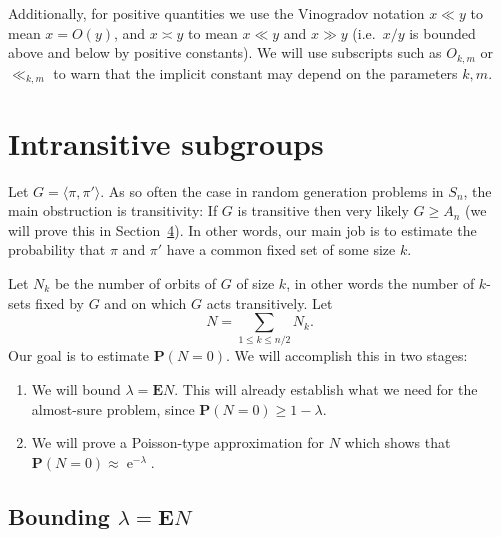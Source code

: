 \documentclass[10pt,a4paper]{amsart}
\newcommand{\ie}{i.e.\ }
\theoremstyle{remark}
\DeclareMathOperator{\expe}{e}
\renewcommand\P{\mathbf{P}}
\newcommand\E{\mathbf{E}}
\begin{document}
Additionally, for positive quantities we use the Vinogradov notation $x \ll y$ to mean $x = O(y)$, and $x \asymp y$ to mean $x \ll y$ and $x \gg y$ (\ie $x/y$ is bounded above and below by positive constants).
We will use subscripts such as $O_{k,m}$ or $\ll_{k,m}$ to warn that the implicit constant may depend on the parameters $k, m$.

\setcounter{section}{2}
\section{Intransitive subgroups} \label{sec:intransitive}

Let $G = \langle \pi, \pi'\rangle$. As so often the case in random generation problems in $S_n$, the main obstruction is transitivity: If $G$ is transitive then very likely $G \geq A_n$ (we will prove this in Section~\href{https://alco.centre-mersenne.org/articles/10.5802/alco.149/}{4}). In other words, our main job is to estimate the probability that $\pi$ and $\pi'$ have a common fixed set of some size $k$.

Let $N_k$ be the number of orbits of $G$ of size $k$, in other words the number of $k$-sets fixed by $G$ and on which $G$ acts transitively. Let
\[
 N = \sum_{1\leq k \leq n/2} N_k.
\]
Our goal is to estimate $\P(N = 0)$. We will accomplish this in two stages:
\begin{enumerate}
 \item\label{sect2.5_1} We will bound $\lambda = \E N$. This will already establish what we need for the almost-sure problem, since $\P(N = 0) \geq 1 - \lambda$.
 \item\label{sect2.5_2} We will prove a Poisson-type approximation for $N$ which shows that $\P(N=0) \approx \expe^{-\lambda}$.
\end{enumerate}

\subsection{Bounding \texorpdfstring{$\lambda = \E N$}{lambda = EN}}
\end{document}
